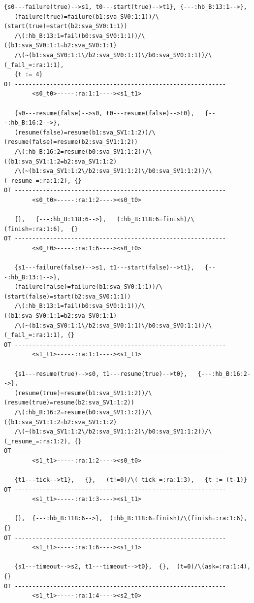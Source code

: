 \documentclass{lncs/llncs}
\begin{document}
\begin{lstlisting}[basicstyle=\scriptsize\ttfamily, frame=single]
   {s0---failure(true)-->s1, t0---start(true)-->t1}, {---:hb_B:13:1-->},
   (failure(true)=failure(b1:sva_SV0:1:1))/\(start(true)=start(b2:sva_SV0:1:1))
   /\(:hb_B:13:1=fail(b0:sva_SV0:1:1))/\((b1:sva_SV0:1:1=b2:sva_SV0:1:1)
   /\(~(b1:sva_SV0:1:1\/b2:sva_SV0:1:1)\/b0:sva_SV0:1:1))/\(_fail_=:ra:1:1),
   {t := 4}
OT ------------------------------------------------------------
        <s0_t0>-----:ra:1:1----><s1_t1>

   {s0---resume(false)-->s0, t0---resume(false)-->t0},   {---:hb_B:16:2-->},
   (resume(false)=resume(b1:sva_SV1:1:2))/\(resume(false)=resume(b2:sva_SV1:1:2))
   /\(:hb_B:16:2=resume(b0:sva_SV1:1:2))/\((b1:sva_SV1:1:2=b2:sva_SV1:1:2)
   /\(~(b1:sva_SV1:1:2\/b2:sva_SV1:1:2)\/b0:sva_SV1:1:2))/\(_resume_=:ra:1:2), {}
OT ------------------------------------------------------------
        <s0_t0>-----:ra:1:2----><s0_t0>

   {},   {---:hb_B:118:6-->},   (:hb_B:118:6=finish)/\(finish=:ra:1:6),  {}
OT ------------------------------------------------------------
        <s0_t0>-----:ra:1:6----><s0_t0>

   {s1---failure(false)-->s1, t1---start(false)-->t1},   {---:hb_B:13:1-->},
   (failure(false)=failure(b1:sva_SV0:1:1))/\(start(false)=start(b2:sva_SV0:1:1))
   /\(:hb_B:13:1=fail(b0:sva_SV0:1:1))/\((b1:sva_SV0:1:1=b2:sva_SV0:1:1)
   /\(~(b1:sva_SV0:1:1\/b2:sva_SV0:1:1)\/b0:sva_SV0:1:1))/\(_fail_=:ra:1:1), {}
OT ------------------------------------------------------------
        <s1_t1>-----:ra:1:1----><s1_t1>

   {s1---resume(true)-->s0, t1---resume(true)-->t0},   {---:hb_B:16:2-->},
   (resume(true)=resume(b1:sva_SV1:1:2))/\(resume(true)=resume(b2:sva_SV1:1:2))
   /\(:hb_B:16:2=resume(b0:sva_SV1:1:2))/\((b1:sva_SV1:1:2=b2:sva_SV1:1:2)
   /\(~(b1:sva_SV1:1:2\/b2:sva_SV1:1:2)\/b0:sva_SV1:1:2))/\(_resume_=:ra:1:2), {}
OT ------------------------------------------------------------
        <s1_t1>-----:ra:1:2----><s0_t0>

   {t1---tick-->t1},   {},   (t!=0)/\(_tick_=:ra:1:3),   {t := (t-1)}
OT ------------------------------------------------------------
        <s1_t1>-----:ra:1:3----><s1_t1>

   {},  {---:hb_B:118:6-->},  (:hb_B:118:6=finish)/\(finish=:ra:1:6),  {}
OT ------------------------------------------------------------
        <s1_t1>-----:ra:1:6----><s1_t1>

   {s1---timeout-->s2, t1---timeout-->t0},  {},  (t=0)/\(ask=:ra:1:4),  {}
OT ------------------------------------------------------------
        <s1_t1>-----:ra:1:4----><s2_t0>


\end{lstlisting}
\end{document}
